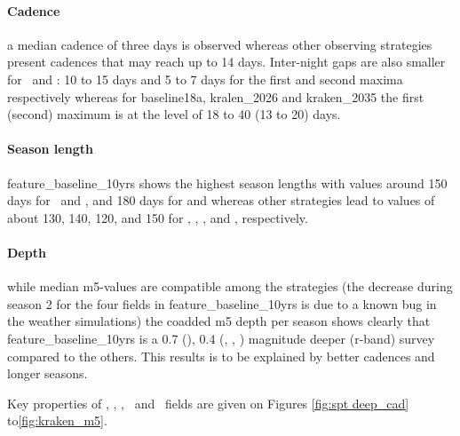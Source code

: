 \paragraph{Cadence} a median cadence of three days is observed whereas other observing strategies present cadences that may reach up to 14 days. Inter-night gaps are also smaller for \cosmos~and \xmmlss: 10 to 15 days and 5 to 7 days for the first and second maxima respectively whereas  for baseline18a, kralen\_2026 and kraken\_2035 the first (second) maximum is at the level of 18 to 40 (13 to 20) days.  

\paragraph{Season length} feature\_baseline\_10yrs shows the highest season lengths with values around 150 days for \cosmos~and \xmmlss, and 180 days for \cdfs and \elais whereas other strategies lead to values of about 130, 140, 120, and 150 for \cosmos, \xmmlss, \cdfs, and \elais, respectively.

\paragraph{Depth} while median m5-values are compatible among the strategies (the decrease during season 2 for the four fields in  feature\_baseline\_10yrs is due to a known bug in the weather simulations) the coadded m5 depth per season shows clearly that feature\_baseline\_10yrs is a 0.7 (\cosmos), 0.4 (\xmmlss, \cdfs, \elais) magnitude deeper (r-band) survey compared to the others. This results is to be explained by better cadences and longer seasons.
 
Key properties of \spt, \ddfa, \ddfb, \ddfc~and \ddfb~fields are given on Figures \ref{fig:spt deep_cad} to\ref{fig:kraken_m5}.
